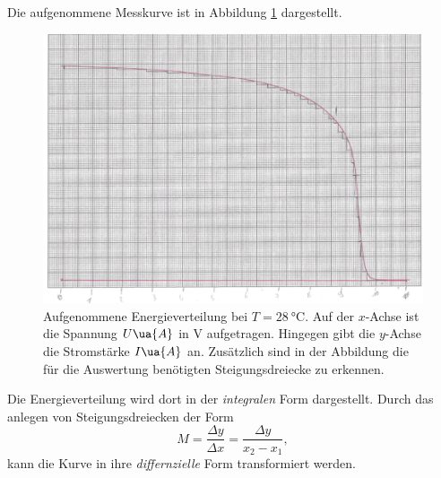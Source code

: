 Die aufgenommene Messkurve ist in Abbildung \ref{fig: messkurve_energie_zim} dargestellt.
\begin{figure}
  \centering
  \includegraphics[width=0.8 \textwidth]{./pics/energieverteilung_zimmer.png}
  \caption{Aufgenommene Energieverteilung bei $T=\SI{28}{\celsius}$. Auf der $x$-Achse ist die Spannung $U\ua{A}$ in $\si{\volt}$ aufgetragen.
          Hingegen gibt die $y$-Achse die Stromstärke $I\ua{A}$ an. Zusätzlich sind in der Abbildung die für die Auswertung benötigten Steigungsdreiecke zu erkennen.} %
  \label{fig: messkurve_energie_zim}
\end{figure}
Die Energieverteilung wird dort in der \emph{integralen} Form dargestellt.
Durch das anlegen von Steigungsdreiecken der Form %
\begin{equation}
  \label{eq:steigung}
    M=\frac{\Delta y}{\Delta x}=\frac{\Delta y}{x_2-x_1},
\end{equation}
kann die Kurve in ihre \emph{differnzielle} Form transformiert werden. %

